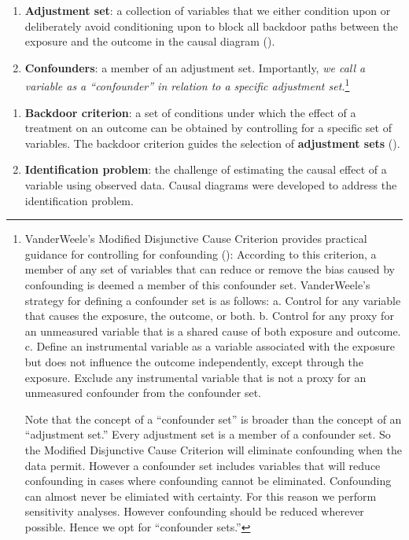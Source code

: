 \documentclass[
  singlecolumn]{article}
\begin{document}
\begin{enumerate}
\def\labelenumi{\arabic{enumi}.}
\setcounter{enumi}{5}
\item
  \textbf{Adjustment set}: a collection of variables that we either
  condition upon or deliberately avoid conditioning upon to block all
  backdoor paths between the exposure and the outcome in the causal
  diagram ().
\item
  \textbf{Confounders}: a member of an adjustment set. Importantly,
  \emph{we call a variable as a ``confounder'' in relation to a specific
  adjustment set.}\footnote{VanderWeele's Modified Disjunctive Cause
    Criterion provides practical guidance for controlling for
    confounding ():
    According to this criterion, a member of any set of variables that
    can reduce or remove the bias caused by confounding is deemed a
    member of this confounder set. VanderWeele's strategy for defining a
    confounder set is as follows: a. Control for any variable that
    causes the exposure, the outcome, or both. b. Control for any proxy
    for an unmeasured variable that is a shared cause of both exposure
    and outcome. c. Define an instrumental variable as a variable
    associated with the exposure but does not influence the outcome
    independently, except through the exposure. Exclude any instrumental
    variable that is not a proxy for an unmeasured confounder from the
    confounder set.

    Note that the concept of a ``confounder set'' is broader than the
    concept of an ``adjustment set.'' Every adjustment set is a member
    of a confounder set. So the Modified Disjunctive Cause Criterion
    will eliminate confounding when the data permit. However a
    confounder set includes variables that will reduce confounding in
    cases where confounding cannot be eliminated. Confounding can almost
    never be elimiated with certainty. For this reason we perform
    sensitivity analyses. However confounding should be reduced wherever
    possible. Hence we opt for ``confounder sets.''}
\end{enumerate}

\begin{enumerate}
\def\labelenumi{\arabic{enumi}.}
\setcounter{enumi}{7}
\item
  \textbf{Backdoor criterion}: a set of conditions under which the
  effect of a treatment on an outcome can be obtained by controlling for
  a specific set of variables. The backdoor criterion guides the
  selection of \textbf{adjustment sets} ().
\item
  \textbf{Identification problem}: the challenge of estimating the
  causal effect of a variable using observed data. Causal diagrams were
  developed to address the identification problem.
\end{enumerate}
\end{document}
